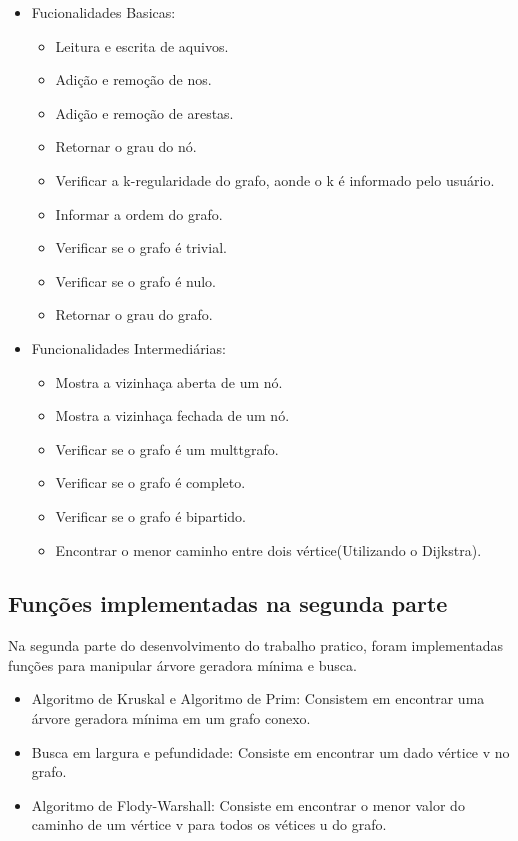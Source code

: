 \documentclass[12pt, fleqn]{article}
\begin{document}
      \begin{itemize}
	\item Fucionalidades Basicas:
	  \begin{itemize}
	      \item Leitura e escrita de aquivos.
	      \item Adição e remoção de nos.
	      \item Adição e remoção de arestas.
	      \item Retornar o grau do nó.
	      \item Verificar a k-regularidade do grafo, aonde o k é informado pelo usuário.
	      \item Informar a ordem do grafo.
	      \item Verificar se o grafo é trivial.
	      \item Verificar se o grafo é nulo.
	      \item Retornar o grau do grafo.
	  \end{itemize}
	  
	\item Funcionalidades Intermediárias:
	  \begin{itemize}
	      \item Mostra a vizinhaça aberta de um nó.
	      \item Mostra a vizinhaça fechada de um nó.
	      \item Verificar se o grafo é um multtgrafo.
	      \item Verificar se o grafo é completo.
	      \item Verificar se o grafo é bipartido.
	      \item Encontrar o menor caminho entre dois vértice(Utilizando o Dijkstra).
	  \end{itemize}
      \end{itemize}

      \newpage

      \subsection{Funções implementadas na segunda parte}
      \par Na segunda parte do desenvolvimento do trabalho pratico, foram implementadas funções para manipular árvore geradora mínima e busca.
	\begin{itemize}
	    \item Algoritmo de Kruskal e Algoritmo de Prim: Consistem em encontrar uma árvore geradora mínima em um grafo conexo.
	    \item Busca em largura e pefundidade: Consiste em encontrar um dado vértice v no grafo. 
	    \item Algoritmo de Flody-Warshall: Consiste em encontrar o menor valor do caminho de um vértice v para todos os vétices u do grafo.
	\end{itemize}
\end{document}

